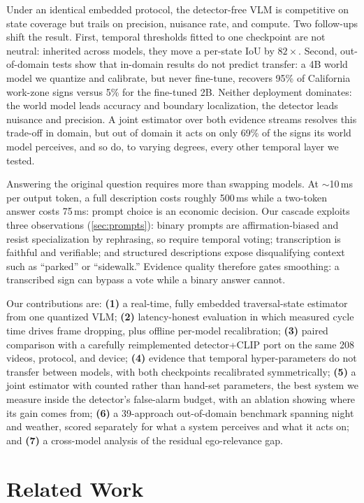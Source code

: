 \documentclass[journal]{IEEEtran}
\begin{document}
Under an identical embedded protocol, the detector-free VLM is competitive on state coverage but trails on precision, nuisance rate, and compute.  Two follow-ups shift the result.  First, temporal thresholds fitted to one checkpoint are not neutral: inherited across models, they move a per-state IoU by $82\times$.  Second, out-of-domain tests show that in-domain results do not predict transfer: a 4B world model we quantize and calibrate, but never fine-tune, recovers 95\% of California work-zone signs versus 5\% for the fine-tuned 2B.  Neither deployment dominates: the world model leads accuracy and boundary localization, the detector leads nuisance and precision.  A joint estimator over both evidence streams resolves this trade-off in domain, but out of domain it acts on only 69\% of the signs its world model perceives, and so do, to varying degrees, every other temporal layer we tested.

Answering the original question requires more than swapping models.  At $\sim$10\,ms per output token, a full description costs roughly 500\,ms while a two-token answer costs 75\,ms: prompt choice is an economic decision.  Our cascade exploits three observations (\cref{sec:prompts}): binary prompts are affirmation-biased and resist specialization by rephrasing, so require temporal voting; transcription is faithful and verifiable; and structured descriptions expose disqualifying context such as ``parked'' or ``sidewalk.''  Evidence quality therefore gates smoothing: a transcribed sign can bypass a vote while a binary answer cannot.

Our contributions are: \textbf{(1)} a real-time, fully embedded traversal-state estimator from one quantized VLM; \textbf{(2)} latency-honest evaluation in which measured cycle time drives frame dropping, plus offline per-model recalibration; \textbf{(3)} paired comparison with a carefully reimplemented detector+CLIP port on the same 208 videos, protocol, and device; \textbf{(4)} evidence that temporal hyper-parameters do not transfer between models, with both checkpoints recalibrated symmetrically; \textbf{(5)} a joint estimator with counted rather than hand-set parameters, the best system we measure inside the detector's false-alarm budget, with an ablation showing where its gain comes from; \textbf{(6)} a 39-approach out-of-domain benchmark spanning night and weather, scored separately for what a system perceives and what it acts on; and \textbf{(7)} a cross-model analysis of the residual ego-relevance gap.

\section{Related Work}
\label{sec:related}
\end{document}
